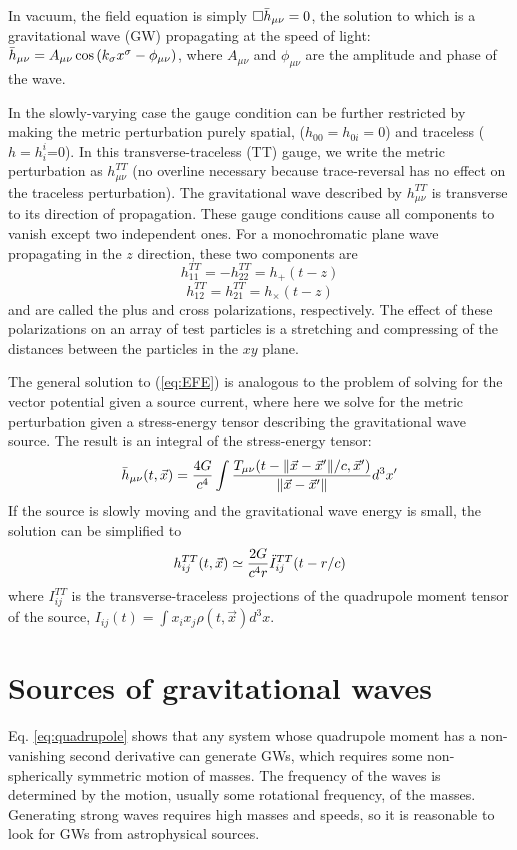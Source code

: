 In vacuum, the field equation is simply $\Box\Bar{h}_{\mu\nu}=0$, the solution to which is a gravitational wave (GW) propagating at the speed of light: $\Bar{h}_{\mu\nu} = A_{\mu\nu}\cos\left(k_\sigma x^\sigma - \phi_{\mu\nu}\right)$, where $A_{\mu\nu}$ and $\phi_{\mu\nu}$ are the amplitude and phase of the wave.

In the slowly-varying case the gauge condition can be further restricted by making the metric perturbation purely spatial, ($h_{00}=h_{0i}=0$) and traceless ($h=h_i^i$=0). In this transverse-traceless (TT) gauge, we write the metric perturbation as $h_{\mu\nu}^{TT}$ (no overline necessary because trace-reversal has no effect on the traceless perturbation). The gravitational wave described by $h_{\mu\nu}^{TT}$ is transverse to its direction of propagation. These gauge conditions cause all components to vanish except two independent ones. For a monochromatic plane wave propagating in the $z$ direction, these two components are
$$h_{11}^{TT} = -h_{22}^{TT} = h_+(t-z)$$
$$h_{12}^{TT} = h_{21}^{TT} = h_{\times}(t-z)$$
and are called the plus and cross polarizations, respectively. The effect of these polarizations on an array of test particles is a stretching and compressing of the distances between the particles in the $xy$ plane.

The general solution to (\ref{eq:EFE}) is analogous to the problem of solving for the vector potential given a source current, where here we solve for the metric perturbation given a stress-energy tensor describing the gravitational wave source. The result is an integral of the stress-energy tensor:
$$\Bar{h}_{\mu\nu}(t, \vec{x}) = \frac{4G}{c^4} \int\frac{T_{\mu\nu}(t - \norm{\vec{x} - \vec{x}'}/c, \vec{x}')}{\norm{\vec{x} - \vec{x}'}} d^3x'$$
If the source is slowly moving and the gravitational wave energy is small, the solution can be simplified to
\begin{equation}\label{eq:quadrupole}
	h_{ij}^{TT}(t, \vec{x}) \simeq \frac{2G}{c^4r} \Ddot{I}_{ij}^{TT}(t - r/c)
\end{equation}
where $I_{ij}^{TT}$ is the transverse-traceless projections of the quadrupole moment tensor of the source, $I_{ij}(t) = \int x_i x_j \rho(t, \vec{x}) d^3x$.

\section{Sources of gravitational waves}

Eq. \ref{eq:quadrupole} shows that any system whose quadrupole moment has a non-vanishing second derivative can generate \acp{GW}, which requires some non-spherically symmetric motion of masses. The frequency of the waves is determined by the motion, usually some rotational frequency, of the masses. Generating strong waves requires high masses and speeds, so it is reasonable to look for \acp{GW} from astrophysical sources.

